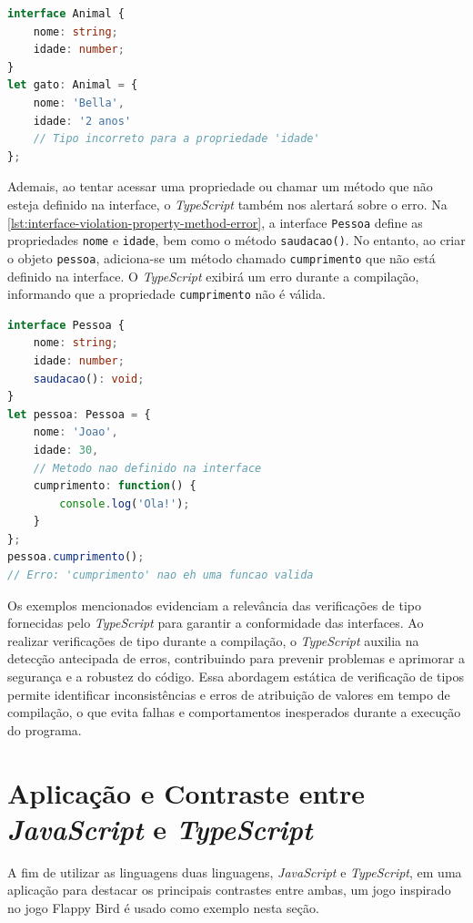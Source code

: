 \begin{lstlisting}[language=TypeScript, caption={Exemplo de erro de tipo ao violar uma interface}, label=lst:interface-violation-type-error]
interface Animal {
    nome: string;
    idade: number;
}
let gato: Animal = {
    nome: 'Bella',
    idade: '2 anos'  
    // Tipo incorreto para a propriedade 'idade'
};
\end{lstlisting}


Ademais, ao tentar acessar uma propriedade ou chamar um método que não esteja definido na interface, o \textit{TypeScript} também nos alertará sobre o erro. Na \autoref{lst:interface-violation-property-method-error}, a interface \texttt{Pessoa} define as propriedades \texttt{nome} e \texttt{idade}, bem como o método \texttt{saudacao()}. No entanto, ao criar o objeto \texttt{pessoa}, adiciona-se um método chamado \texttt{cumprimento} que não está definido na interface. O \textit{TypeScript} exibirá um erro durante a compilação, informando que a propriedade \texttt{cumprimento} não é válida.



\begin{lstlisting}[language=TypeScript, caption={Exemplo de erro ao acessar propriedade e método não definidos na interface}, label=lst:interface-violation-property-method-error]
interface Pessoa {
    nome: string;
    idade: number;
    saudacao(): void;
}
let pessoa: Pessoa = {
    nome: 'Joao',
    idade: 30,
    // Metodo nao definido na interface
    cumprimento: function() {  
        console.log('Ola!');
    }
};
pessoa.cumprimento();  
// Erro: 'cumprimento' nao eh uma funcao valida
\end{lstlisting}


Os exemplos mencionados evidenciam a relevância das verificações de tipo fornecidas pelo \textit{TypeScript} para garantir a conformidade das interfaces. Ao realizar verificações de tipo durante a compilação, o \textit{TypeScript} auxilia na detecção antecipada de erros, contribuindo para prevenir problemas e aprimorar a segurança e a robustez do código. Essa abordagem estática de verificação de tipos permite identificar inconsistências e erros de atribuição de valores em tempo de compilação, o que evita falhas e comportamentos inesperados durante a execução do programa.


\section{Aplicação e Contraste entre \textit{JavaScript} e \textit{TypeScript}}
\label{JS_applicacaoExemplo}
A fim de utilizar as linguagens duas linguagens, \textit{JavaScript} e \textit{TypeScript}, em uma aplicação para destacar os principais contrastes entre ambas, um jogo inspirado no jogo Flappy Bird é usado como exemplo nesta seção.

